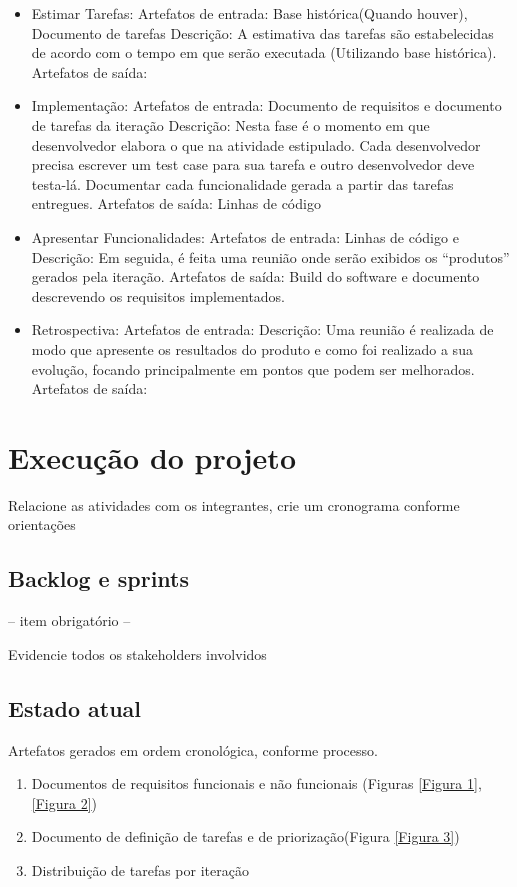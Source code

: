 \documentclass[	DIV=calc,%
							paper=a4,%
							fontsize=12pt,%
							onecolumn]{scrartcl}	 					%
\begin{document}
\begin{itemize}
	\item Estimar Tarefas:  
	\subitem Artefatos de entrada: Base histórica(Quando houver), Documento de tarefas
	\subitem Descrição: A estimativa das tarefas são estabelecidas de acordo com o tempo em que serão executada (Utilizando base histórica).
	\subitem Artefatos de saída: 
	
	\item Implementação: 
	\subitem Artefatos de entrada: Documento de requisitos e documento de tarefas da iteração 
	\subitem Descrição: Nesta fase é o momento em que desenvolvedor elabora o que na atividade estipulado. Cada desenvolvedor precisa escrever um test case para sua tarefa e outro desenvolvedor deve testa-lá. Documentar cada funcionalidade gerada a partir das tarefas entregues.
	\subitem Artefatos de saída: Linhas de código 
	
	\item Apresentar Funcionalidades: 
	\subitem Artefatos de entrada: Linhas de código e 
	\subitem Descrição: Em seguida, é feita uma reunião onde serão exibidos os “produtos” gerados pela iteração. 
	\subitem Artefatos de saída: Build do software e documento descrevendo os requisitos implementados. 
	
	\item Retrospectiva: 
	\subitem Artefatos de entrada:
	\subitem Descrição: Uma reunião é realizada de modo que apresente os resultados do produto e como foi realizado a sua evolução, focando principalmente em pontos que podem ser melhorados.
	\subitem Artefatos de saída:
\end{itemize}


\section{Execução do projeto}

Relacione as atividades com os integrantes, crie um cronograma conforme orientações
\subsection{Backlog e sprints}
-- item obrigatório --

Evidencie todos os stakeholders involvidos


\subsection{Estado atual}
Artefatos gerados em ordem cronológica, conforme processo. 
\begin{enumerate}
	\item Documentos de requisitos funcionais e não funcionais (Figuras \ref{Figura 1}, \ref{Figura 2})
	\item Documento de definição de tarefas e de priorização(Figura \ref{Figura 3})
	\item Distribuição de tarefas por iteração
\end{enumerate}
\end{document}
